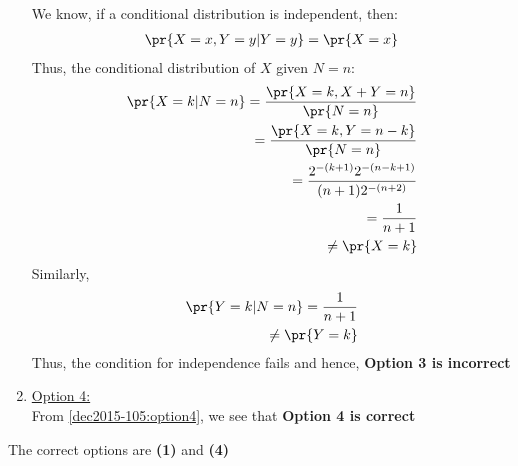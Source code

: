 \begin{enumerate}
 We know, if a conditional distribution is independent, then:
\begin{align}
    \pr{X = x,Y=y | Y=y} = \pr{X=x}
\end{align}
Thus, the conditional distribution of $X$ given $N=n$:\\
{\small
\begin{align}
    \pr{X=k|N=n} = \frac{\pr{X=k,X+Y=n}}{\pr{N=n}}\\
    =\frac{\pr{X=k,Y=n-k}}{\pr{N=n}}\\
    =\frac{2^{-(k+1)}2^{-(n-k+1)}}{(n+1) 2^{-(n+2)}}\\
    = \frac{1}{n+1} 
    \label{dec2015-105:option4}\\
    \neq \pr{X = k}
\end{align}
}
Similarly,
\begin{align}
    \pr{Y=k|N=n} = \frac{1}{n+1}\\
    \neq \pr{Y=k}
\end{align}
Thus, the condition for independence fails and hence, \textbf{Option 3 is incorrect}\\
\item \underline{Option 4:}\\
From \eqref{dec2015-105:option4}, we see that \textbf{Option 4 is correct}\\
    
\end{enumerate}
The correct options are \textbf{(1)} and \textbf{(4)}